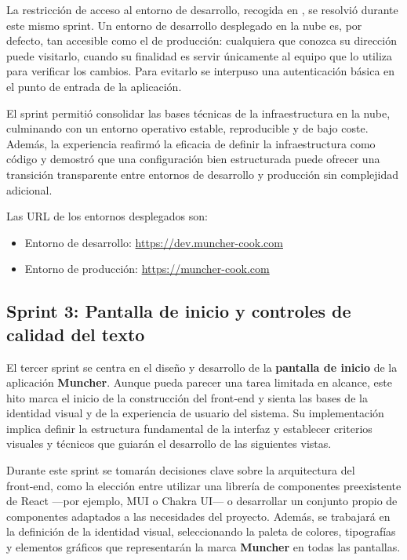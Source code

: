 La restricción de acceso al entorno de desarrollo, recogida en
, se resolvió durante este mismo sprint. Un entorno de
desarrollo desplegado en la nube es, por defecto, tan accesible como el de
producción: cualquiera que conozca su dirección puede visitarlo, cuando su
finalidad es servir únicamente al equipo que lo utiliza para verificar los
cambios. Para evitarlo se interpuso una autenticación básica en el punto de
entrada de la aplicación.

El sprint permitió consolidar las bases técnicas de la infraestructura en la
nube, culminando con un entorno operativo estable, reproducible y de bajo
coste. Además, la experiencia reafirmó la eficacia de definir la infraestructura
como código y demostró que una configuración bien estructurada puede ofrecer una
transición transparente entre entornos de desarrollo y producción sin
complejidad adicional.

Las URL de los entornos desplegados son:

\begin{itemize}
	\item Entorno de desarrollo: \url{https://dev.muncher-cook.com}
	\item Entorno de producción: \url{https://muncher-cook.com}
\end{itemize}

\subsection*{Sprint 3: Pantalla de inicio y controles de calidad del texto}

El tercer sprint se centra en el diseño y desarrollo de la \textbf{pantalla de
	inicio} de la aplicación \textbf{Muncher}. Aunque pueda parecer una tarea
limitada en alcance, este hito marca el inicio de la construcción del front‑end
y sienta las bases de la identidad visual y de la experiencia de usuario del
sistema. Su implementación implica definir la estructura fundamental de la
interfaz y establecer criterios visuales y técnicos que guiarán el desarrollo
de las siguientes vistas.

Durante este sprint se tomarán decisiones clave sobre la arquitectura del
front‑end, como la elección entre utilizar una librería de componentes
preexistente de React —por ejemplo, MUI o Chakra UI— o desarrollar un conjunto
propio de componentes adaptados a las necesidades del proyecto. Además, se
trabajará en la definición de la identidad visual, seleccionando la paleta de
colores, tipografías y elementos gráficos que representarán la marca
\textbf{Muncher} en todas las pantallas.

